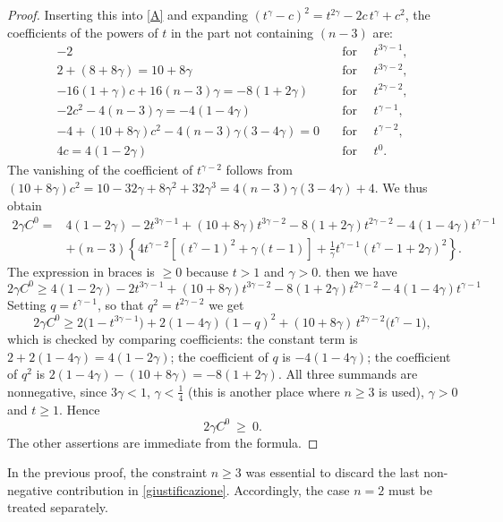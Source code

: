 \documentclass[11pt]{amsart}
\renewcommand{\geq}{\geqslant}
\renewcommand{\ge}{>}
\theoremstyle{definition}
\theoremstyle{remark}
\numberwithin{equation}{section}
\begin{document}
\begin{proof}
\medskip
\noindent
Inserting this into \eqref{A} and expanding $(t^\gamma-c)^2=t^{2\gamma}-2c\,t^\gamma+c^2$, the coefficients of the powers of $t$ in the part not containing $(n-3)$ are:
\begin{align*}
   -2 & \quad \text{for }\quad t^{3\gamma-1},\\
   2+(8+8\gamma)=10+8\gamma &\quad \text{for }\quad t^{3\gamma-2},\\
  -16(1+\gamma)c+16(n-3)\gamma=-8(1+2\gamma) &\quad \text{for }\quad  t^{2\gamma-2},\\
  -2c^2-4(n-3)\gamma=-4(1-4\gamma) &\quad \text{for }\quad t^{\gamma-1}, \\
  -4+(10+8\gamma)c^2-4(n-3)\gamma(3-4\gamma)=0 &\quad \text{for }\quad t^{\gamma-2},\\
  4c=4(1-2\gamma)&\quad \text{for }\quad t^{0}.
\end{align*}
The vanishing of the coefficient of $t^{\gamma-2}$ follows from
$(10+8\gamma)c^2=10-32\gamma+8\gamma^2+32\gamma^3=4(n-3)\gamma(3-4\gamma)+4$.
We thus obtain 
\begin{equation}\label{giustificazione}
 \begin{split}
 2\gamma C^0={}&4(1-2\gamma)-2t^{3\gamma-1}
 +(10+8\gamma)t^{3\gamma-2}-8(1+2\gamma)t^{2\gamma-2}
 -4(1-4\gamma)t^{\gamma-1}\\
 &+(n-3)\left\{
 4t^{\gamma-2}[(t^\gamma-1)^2+\gamma(t-1)]
 +\frac1\gamma t^{\gamma-1}(t^\gamma-1+2\gamma)^2\right\}.
 \end{split}
\end{equation}
The expression in braces is $\geq 0$ because $t\ge1$ and $\gamma>0$. then we have 
\[
 2\gamma C^0 \geq 4(1-2\gamma)-2t^{3\gamma-1}
 +(10+8\gamma)t^{3\gamma-2}-8(1+2\gamma)t^{2\gamma-2}
 -4(1-4\gamma)t^{\gamma-1}
\]
Setting $q=t^{\gamma-1}$, so that $q^2=t^{2\gamma-2}$ we get 
\[
  2\gamma C^0 \geq 2\big(1-t^{3\gamma-1}\big)+2(1-4\gamma)(1-q)^2+(10+8\gamma)\,t^{2\gamma-2}\big(t^{\gamma}-1\big),
\]
which is checked by comparing coefficients: the constant term is $2+2(1-4\gamma)=4(1-2\gamma)$; the coefficient of $q$ is $-4(1-4\gamma)$; the coefficient of $q^2$ is $2(1-4\gamma)-(10+8\gamma)=-8(1+2\gamma)$. All three summands are nonnegative, since $3\gamma<1$, $\gamma<\tfrac14$ (this is another place where $n\geq 3$ is used), $\gamma>0$ and $t\geq1$. Hence
\[
  2\gamma C^0\ \geq \ 0 .
\]
The other assertions are immediate from the formula.
\end{proof}
In the previous proof, the constraint $n\geq 3$ was essential to discard the last non-negative contribution in \eqref{giustificazione}. Accordingly, the case $n=2$ must be treated separately.
\end{document}
